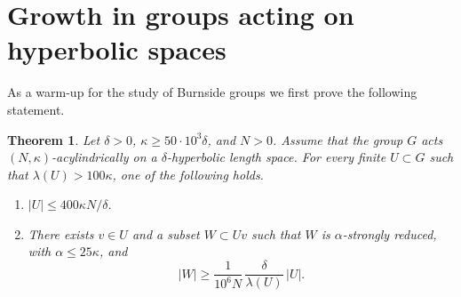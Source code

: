 \documentclass[JEP,XML,SOM,Unicode, NoEqCountersInSection,published]{cedram}
\theoremstyle{plain}
\newtheorem{thm}{Theorem}[section]
\theoremstyle{definition}
\begin{document}
\section{Growth in groups acting on hyperbolic spaces}\label{S: basepoint}

As a warm-up for the study of Burnside groups we first prove the following statement.

\begin{thm}\label{T: main acylindrical}
Let $\delta >0$, $\kappa\geqslant 50\cdot 10^3\delta$, and $N>0$.
Assume that the group $G$ acts $(N,\kappa)$-acylindrically on a $\delta$-hyperbolic length space.
For every finite $U\subset G$ such that $\lambda(U)> 100\kappa$, one of the following holds.
\begin{enumerate}
\item $\displaystyle |U| \leq 400\kappa N/\delta$.
\item There exists $v \in U$ and a subset $W \subset Uv$ such that $W$ is $\alpha$-strongly reduced, with $\alpha \leq 25\kappa$, and
\begin{equation*}
|W| \geq \frac 1{10^6N}\,\frac \delta{\lambda(U)}\, |U|.
\end{equation*}
\end{enumerate}

\end{thm}
\end{document}
